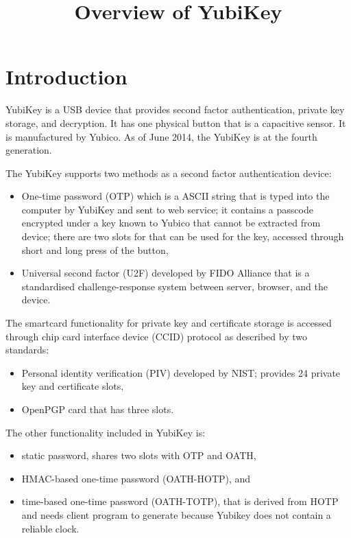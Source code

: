 \documentclass[a4paper]{article}
\title{Overview of YubiKey}
\begin{document}
	
\maketitle


\section{Introduction}

YubiKey is a USB device that provides second factor authentication, private key storage, and decryption. It has one physical button that is a capacitive sensor. It is manufactured by Yubico. As of June 2014, the YubiKey is at the fourth generation.

The YubiKey supports two methods as a second factor authentication device:
\begin{itemize}
	\item One-time password (OTP) which is a ASCII string that is typed into the computer by YubiKey and sent to web service; it contains a passcode encrypted under a key known to Yubico that cannot be extracted from device; there are two slots for that can be used for the key, accessed through short and long press of the button,
	\item Universal second factor (U2F) developed by FIDO Alliance that is a standardised challenge-response system between server, browser, and the device.
\end{itemize}

The smartcard functionality for private key and certificate storage is accessed through chip card interface device (CCID) protocol as described by two standards:
\begin{itemize}
	\item Personal identity verification (PIV) developed by NIST; provides 24 private key and certificate slots,
	\item OpenPGP card that has three slots.
\end{itemize}

The other functionality included in YubiKey is:
\begin{itemize}
	\item static password, shares two slots with OTP and OATH,
	\item HMAC-based one-time password (OATH-HOTP), and
	\item time-based one-time password (OATH-TOTP), that is derived from HOTP and needs client program to generate because Yubikey does not contain a reliable clock.
\end{itemize}
\end{document}
